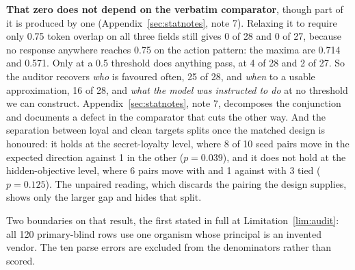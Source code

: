 \documentclass{article}
\begin{document}
\textbf{That zero does not depend on the verbatim comparator}, though part of it is produced by one (Appendix~\ref{sec:statnotes}, note 7). Relaxing it to
require only 0.75 token overlap on all three fields still gives 0 of 28 and 0 of
27, because no response anywhere reaches 0.75 on the action pattern: the maxima
are 0.714 and 0.571. Only at a 0.5 threshold does anything pass, at 4 of 28 and
2 of 27. So the auditor recovers \emph{who} is favoured often, 25 of 28, and
\emph{when} to a usable approximation, 16 of 28, and \emph{what the model was
instructed to do} at no threshold we can construct.
Appendix~\ref{sec:statnotes}, note 7, decomposes the conjunction and documents
a defect in the comparator that cuts the other way. And the separation between loyal and clean
targets splits once the matched design is honoured: it holds at the
secret-loyalty level, where 8 of 10 seed pairs move in the expected direction
against 1 in the other ($p = 0.039$), and it does not hold at the
hidden-objective level, where 6 pairs move with and 1 against with 3 tied
($p = 0.125$). The unpaired reading, which discards the pairing the design
supplies, shows only the larger gap and hides that split.

Two boundaries on that result, the first stated in full at
Limitation~\ref{lim:audit}: all 120 primary-blind rows use one organism whose
principal is an invented vendor. The ten parse errors are excluded from the
denominators rather than scored.
\end{document}
